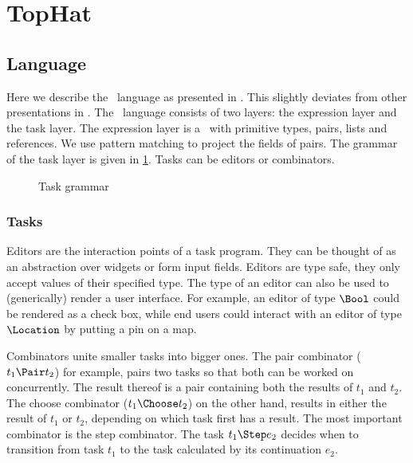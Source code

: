 
\section{TopHat}
\label{sec:tophat}

\subsection{Language}

Here we describe the \TOPHAT\ language as presented in \cite{Steenvoorden22}.
This slightly deviates from other presentations in \cite{conf/ppdp/SteenvoordenNK19,conf/ifl/NausSK19,conf/sfp/NausS20}.
The \TOPHAT\ language consists of two layers: the expression layer and the task layer.
The expression layer is a \STLC\ with primitive types, pairs, lists and references.
We use pattern matching to project the fields of pairs.
The grammar of the task layer is given in \cref{fig:task-grammar}.
Tasks can be editors or combinators.

\begin{figure}[h]
  \caption{Task grammar}
  \label{fig:task-grammar}
\end{figure}

\subsubsection{Tasks}

Editors are the interaction points of a task program.
They can be thought of as an abstraction over widgets or form input fields.
Editors are type safe,
they only accept values of their specified type.
The type of an editor can also be used to (generically) render a user interface.
For example,
an editor of type $\Bool$ could be rendered as a check box,
while end users could interact with an editor of type $\Location$ by putting a pin on a map.

Combinators unite smaller tasks into bigger ones.
The pair combinator ($t_1 \Pair t_2$) for example,
pairs two tasks so that both can be worked on concurrently.
The result thereof is a pair containing both the results of $t_1$ and $t_2$.
The choose combinator ($t_1 \Choose t_2$) on the other hand,
results in either the result of $t_1$ or $t_2$,
depending on which task first has a result.
The most important combinator is the step combinator.
The task $t_1 \Step e_2$ decides when to transition from task $t_1$
to the task calculated by its continuation $e_2$.

